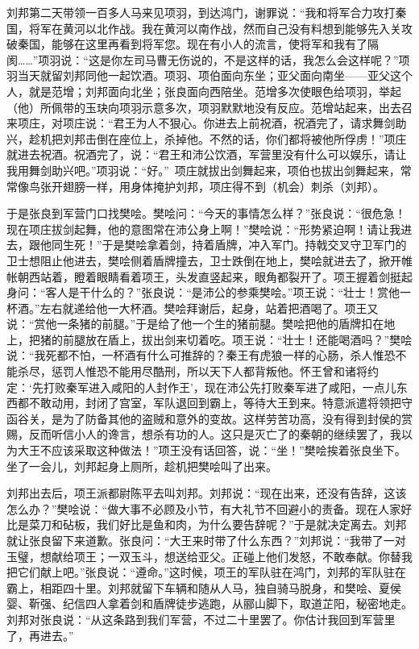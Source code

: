 \documentclass[12pt,UTF-8,openany,a4]{ctexbook}
\begin{document}
\begin{large}
    刘邦第二天带领一百多人马来见项羽，到达鸿门，谢罪说：“我和将军合力攻打秦国，将军在黄河以北作战。我在黄河以南作战，然而自己没有料想到能够先入关攻破秦国，能够在这里再看到将军您。现在有小人的流言，使将军和我有了隔阂……”项羽说：“这是你左司马曹无伤说的，不是这样的话，我怎么会这样呢？”项羽当天就留刘邦同他一起饮酒。项羽、项伯面向东坐；亚父面向南坐——亚父这个人，就是范增；刘邦面向北坐；张良面向西陪坐。范增多次使眼色给项羽，举起（他）所佩带的玉玦向项羽示意多次，项羽默默地没有反应。范增站起来，出去召来项庄，对项庄说：“君王为人不狠心。你进去上前祝酒，祝酒完了，请求舞剑助兴，趁机把刘邦击倒在座位上，杀掉他。不然的话，你们都将被他所俘虏！”项庄就进去祝酒。祝酒完了，说：“君王和沛公饮酒，军营里没有什么可以娱乐，请让我用舞剑助兴吧。”项羽说：“好。” 项庄就拔出剑舞起来，项伯也拔出剑舞起来，常常像鸟张开翅膀一样，用身体掩护刘邦，项庄得不到（机会）刺杀（刘邦）。
    
    于是张良到军营门口找樊哙。樊哙问：“今天的事情怎么样？”张良说：“很危急！现在项庄拔剑起舞，他的意图常在沛公身上啊！”樊哙说：“形势紧迫啊！请让我进去，跟他同生死！”于是樊哙拿着剑，持着盾牌，冲入军门。持戟交叉守卫军门的卫士想阻止他进去，樊哙侧着盾牌撞去，卫士跌倒在地上，樊哙就进去了，掀开帷帐朝西站着，瞪着眼睛看着项王，头发直竖起来，眼角都裂开了。项王握着剑挺起身问：“客人是干什么的？”张良说：“是沛公的参乘樊哙。”项王说：“壮士！赏他一杯酒。”左右就递给他一大杯酒。樊哙拜谢后，起身，站着把酒喝了。项王又说：“赏他一条猪的前腿。”于是给了他一个生的猪前腿。樊哙把他的盾牌扣在地上，把猪的前腿放在盾上，拔出剑来切着吃。项王说：“壮士！还能喝酒吗？”樊哙说：“我死都不怕，一杯酒有什么可推辞的？秦王有虎狼一样的心肠，杀人惟恐不能杀尽，惩罚人惟恐不能用尽酷刑，所以天下人都背叛他。怀王曾和诸将约定：‘先打败秦军进入咸阳的人封作王’，现在沛公先打败秦军进了咸阳，一点儿东西都不敢动用，封闭了宫室，军队退回到霸上，等待大王到来。特意派遣将领把守函谷关，是为了防备其他的盗贼和意外的变故。这样劳苦功高，没有得到封侯的赏赐，反而听信小人的谗言，想杀有功的人。这只是灭亡了的秦朝的继续罢了，我以为大王不应该采取这种做法！”项王没有话回答，说：“坐！”樊哙挨着张良坐下。坐了一会儿，刘邦起身上厕所，趁机把樊哙叫了出来。
    
    刘邦出去后，项王派都尉陈平去叫刘邦。刘邦说：“现在出来，还没有告辞，这该怎么办？”樊哙说：“做大事不必顾及小节，有大礼节不回避小的责备。现在人家好比是菜刀和砧板，我们好比是鱼和肉，为什么要告辞呢？”于是就决定离去。刘邦就让张良留下来道歉。张良问：“大王来时带了什么东西？”刘邦说：“我带了一对玉璧，想献给项王；一双玉斗，想送给亚父。正碰上他们发怒，不敢奉献。你替我把它们献上吧。”张良说：“遵命。”这时候，项王的军队驻在鸿门，刘邦的军队驻在霸上，相距四十里。刘邦就留下车辆和随从人马，独自骑马脱身，和樊哙、夏侯婴、靳强、纪信四人拿着剑和盾牌徒步逃跑，从郦山脚下，取道芷阳，秘密地走。刘邦对张良说：“从这条路到我们军营，不过二十里罢了。你估计我回到军营里了，再进去。”
    

\end{large}
\end{document}
